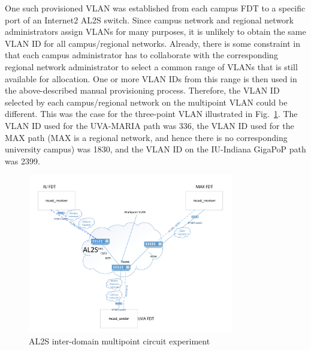One such provisioned VLAN was established from each campus FDT to a specific
port of an Internet2 AL2S switch. Since campus network and regional network
administrators assign VLANs for many purposes, it is unlikely to obtain the
same VLAN ID for all campus/regional networks. Already, there is some constraint
in that each campus administrator has to collaborate with the corresponding
regional network administrator to select a common range of VLANs that is still available
for allocation. One or more VLAN IDs from this range is then used in the
above-described manual provisioning process. Therefore,
the VLAN ID selected by each campus/regional network on the multipoint VLAN
could be different. This was the case for the three-point VLAN illustrated
in Fig.~\ref{fig:wanmulticast}. The VLAN ID used for the UVA-MARIA path was 336,
the VLAN ID used for the MAX path (MAX is a regional network, and hence there
is no corresponding university campus) was 1830, and the VLAN ID on the IU-Indiana
GigaPoP path was 2399.
\begin{figure}[htb!]
\centering
\includegraphics[width=0.8\textwidth]{figures/AL2S-mcast.pdf}
\caption{AL2S inter-domain multipoint circuit experiment}
\label{fig:wanmulticast}
\end{figure}

